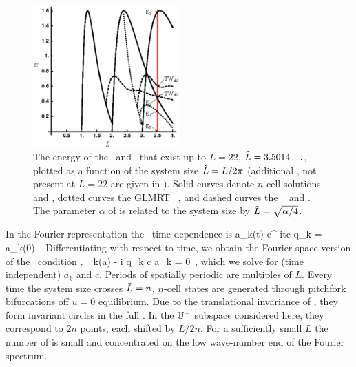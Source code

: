 \begin{figure}[t]       \label{fig:ksBifDiag}
\begin{center}
\includegraphics[width=0.5\textwidth]{figs_bmp/ksBifDiag_pst.eps}
\end{center}
\caption{
The energy  of the \eqva\ and \reqva\ that
exist up to $L=22$, $\tilde{L} = 3.5014\ldots$, plotted as a function
of the system size $\tilde{L} = L/2\pi$ (additional \eqva, not present
at $L = 22$ are given in ). Solid curves denote
$n$-cell solutions  and , dotted curves the GLMRT
\eqv\ ,
and dashed curves the \reqva\  and .
The parameter $\alpha$ of  is
related to the system size by $\tilde{L}=\sqrt{\alpha/4}$.
        }
\end{figure}

In the Fourier representation the \reqva\ time
dependence is
\beq
 a_k(t) e^{-itc q_k} = a_k(0)
\,.
Differentiating with respect to time, we obtain
the Fourier space version of the \reqv\ condition
,
\beq
 \pVeloc_k(a) - i q_k c a_k = 0
\,,
which we solve for (time independent) $a_k$ and $c$.
Periods of spatially periodic {\eqva} are multiples of $L$.
Every time the system size crosses  $\tilde{L}=n$,
$n$-cell states
are generated through pitchfork bifurcations off $u =0$
equilibrium.
Due to the translational invariance of {\KSe},
they form invariant circles
in the full \statesp.
In the $\mathbb{U}^+$ subspace considered here,
they correspond to $2n$ points, each shifted by $L/2n$.
For a sufficiently small $L$
the number of {\eqva} is small and
concentrated on the low wave-number end of the Fourier spectrum.

